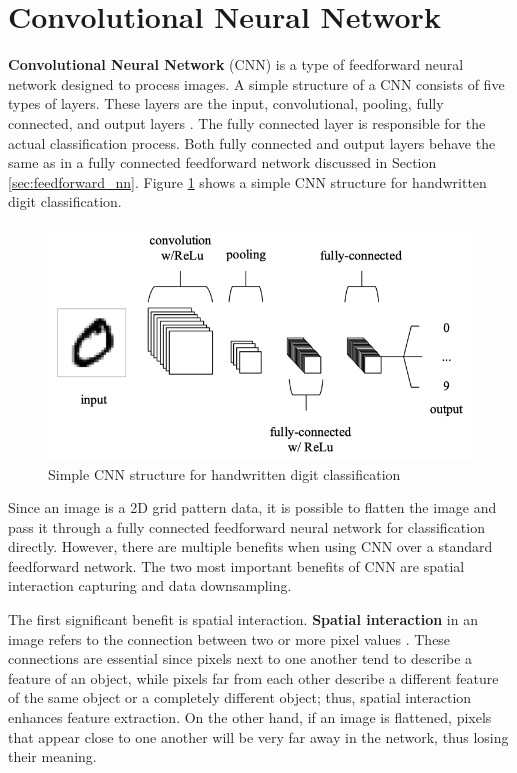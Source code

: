 \section{Convolutional Neural Network} \label{sec:cnn}

\textbf{Convolutional Neural Network} (CNN) is a type of feedforward neural network designed to process images. A simple structure of a CNN consists of five types of layers. These layers are the input, convolutional, pooling, fully connected, and output layers \cite{o2015introduction}. The fully connected layer is responsible for the actual classification process. Both fully connected and output layers behave the same as in a fully connected feedforward network discussed in Section \ref{sec:feedforward_nn}. Figure \ref{fig:simple_cnn_diagram} shows a simple CNN structure for handwritten digit classification.

\begin{figure}[!ht]
    \centering
    \includegraphics[width=4.5in]{figures/simple_cnn.png}
    \caption{Simple CNN structure for handwritten digit classification \cite{o2015introduction}}
    \label{fig:simple_cnn_diagram}
\end{figure}

Since an image is a 2D grid pattern data, it is possible to flatten the image and pass it through a fully connected feedforward neural network for classification directly. However, there are multiple benefits when using CNN over a standard feedforward network. The two most important benefits of CNN are spatial interaction capturing and data downsampling.

The first significant benefit is spatial interaction. \textbf{Spatial interaction} in an image refers to the connection between two or more pixel values \cite{goodfellow_book}. These connections are essential since pixels next to one another tend to describe a feature of an object, while pixels far from each other describe a different feature of the same object or a completely different object; thus, spatial interaction enhances feature extraction. On the other hand, if an image is flattened, pixels that appear close to one another will be very far away in the network, thus losing their meaning.

